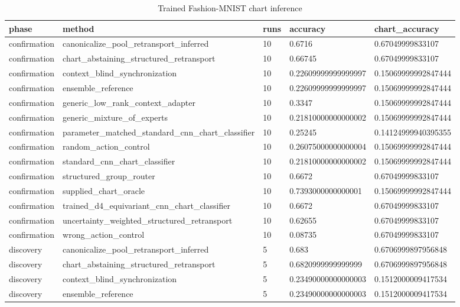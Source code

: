\begin{table}[t]
\centering
\caption{Trained Fashion-MNIST chart inference}
\begin{tabular}{lllll}
\toprule
phase & method & runs & accuracy & chart\_accuracy \\
\midrule
confirmation & canonicalize\_pool\_retransport\_inferred & 10 & 0.6716 & 0.67049999833107 \\
confirmation & chart\_abstaining\_structured\_retransport & 10 & 0.66745 & 0.67049999833107 \\
confirmation & context\_blind\_synchronization & 10 & 0.22609999999999997 & 0.15069999992847444 \\
confirmation & ensemble\_reference & 10 & 0.22609999999999997 & 0.15069999992847444 \\
confirmation & generic\_low\_rank\_context\_adapter & 10 & 0.3347 & 0.15069999992847444 \\
confirmation & generic\_mixture\_of\_experts & 10 & 0.21810000000000002 & 0.15069999992847444 \\
confirmation & parameter\_matched\_standard\_cnn\_chart\_classifier & 10 & 0.25245 & 0.14124999940395355 \\
confirmation & random\_action\_control & 10 & 0.26075000000000004 & 0.15069999992847444 \\
confirmation & standard\_cnn\_chart\_classifier & 10 & 0.21810000000000002 & 0.15069999992847444 \\
confirmation & structured\_group\_router & 10 & 0.6672 & 0.67049999833107 \\
confirmation & supplied\_chart\_oracle & 10 & 0.7393000000000001 & 0.15069999992847444 \\
confirmation & trained\_d4\_equivariant\_cnn\_chart\_classifier & 10 & 0.6672 & 0.67049999833107 \\
confirmation & uncertainty\_weighted\_structured\_retransport & 10 & 0.62655 & 0.67049999833107 \\
confirmation & wrong\_action\_control & 10 & 0.08735 & 0.67049999833107 \\
discovery & canonicalize\_pool\_retransport\_inferred & 5 & 0.683 & 0.6706999897956848 \\
discovery & chart\_abstaining\_structured\_retransport & 5 & 0.6820999999999999 & 0.6706999897956848 \\
discovery & context\_blind\_synchronization & 5 & 0.23490000000000003 & 0.1512000009417534 \\
discovery & ensemble\_reference & 5 & 0.23490000000000003 & 0.1512000009417534 \\

\end{tabular}
\end{table}
